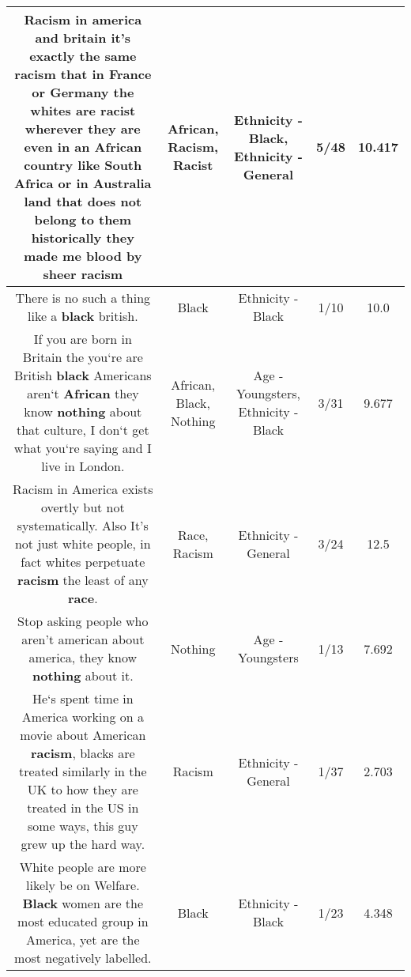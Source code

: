 \documentclass[11pt]{article}
\newlength\mylength
\begin{document}
\begin{center}
\begin{longtable}{|C{.65\mylength}|C{.30\mylength}|C{.12\mylength}|C{.12\mylength}|C{.12\mylength}|}
  \small Racism in america and britain it's exactly the same \textbf{racism} that in France or Germany the whites are \textbf{racist} wherever they are even in an \textbf{African} country like South Africa or in Australia land that does not belong to them historically they made me blood by sheer racism\normalsize   & African, Racism, Racist & Ethnicity - Black, Ethnicity - General & 5/48 & 10.417 \\  \hline
  \small There is no such a thing like a \textbf{black} british.\normalsize   & Black & Ethnicity - Black & 1/10 & 10.0 \\  \hline
  \small If you are born in Britain the you`re are British \textbf{black} Americans aren`t \textbf{African} they know \textbf{nothing} about that culture, I don`t get what you`re saying and I live in London.\normalsize   & African, Black, Nothing & Age - Youngsters, Ethnicity - Black & 3/31 & 9.677 \\  \hline
  \small Racism in America exists overtly but not systematically. Also It's not just white people, in fact whites perpetuate \textbf{racism} the least of any \textbf{race}.\normalsize   & Race, Racism & Ethnicity - General & 3/24 & 12.5 \\  \hline
  \small Stop asking people who aren't american about america, they know \textbf{nothing} about it.\normalsize   & Nothing & Age - Youngsters & 1/13 & 7.692 \\  \hline
  \small He`s spent time in America working on a movie about American \textbf{racism}, blacks are treated similarly in the UK to how they are treated in the US in some ways, this guy grew up the hard way.\normalsize   & Racism & Ethnicity - General & 1/37 & 2.703 \\  \hline
  \small White people are more likely be on Welfare. \textbf{Black} women are the most educated group in America, yet are the most negatively labelled.\normalsize   & Black & Ethnicity - Black & 1/23 & 4.348 \\  \hline

\end{longtable}
\end{center}
\end{document}
